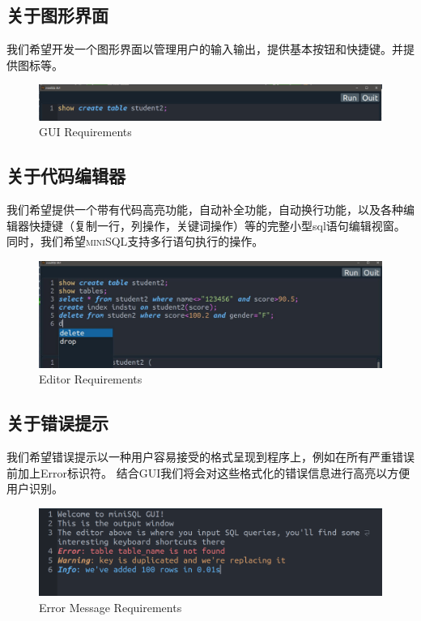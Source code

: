\documentclass[UTF8]{ctexrep} %
\begin{document}
\subsection{关于图形界面}
我们希望开发一个图形界面以管理用户的输入输出，提供基本按钮和快捷键。并提供图标等。
\begin{figure}[H]
    \centering
    \includegraphics[width=\linewidth]{figure/gui_requirements.png}
    \caption{GUI Requirements}
    \label{fig:gui_requirements}
\end{figure}
\subsection{关于代码编辑器}
我们希望提供一个带有代码高亮功能，自动补全功能，自动换行功能，以及各种编辑器快捷键（复制一行，列操作，关键词操作）等的完整小型sql语句编辑视窗。
同时，我们希望\textsc{miniSQL}支持多行语句执行的操作。
\begin{figure}[H]
    \centering
    \includegraphics[width=\linewidth]{figure/editor_requirements.jpg}
    \caption{Editor Requirements}
    \label{fig:editor_requirements}
\end{figure}

\subsection{关于错误提示}
我们希望错误提示以一种用户容易接受的格式呈现到程序上，例如在所有严重错误前加上Error标识符。
结合GUI我们将会对这些格式化的错误信息进行高亮以方便用户识别。
\begin{figure}[H]
    \centering
    \includegraphics[width=\linewidth]{figure/error_requirements.png}
    \caption{Error Message Requirements}
    \label{fig:error_message_requirements}
\end{figure}
\end{document}
